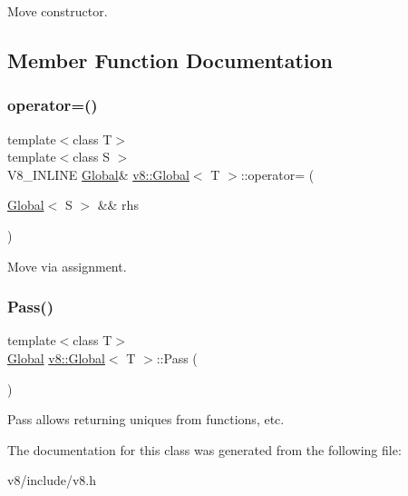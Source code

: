 Move constructor. 

\subsection{Member Function Documentation}
\mbox{\label{classv8_1_1Global_a9d3d7d8f10ad23e413f2027cc15ab209}} 
\subsubsection{\texorpdfstring{operator=()}{operator=()}}
{\footnotesize\ttfamily template$<$class T$>$ \\
template$<$class S $>$ \\
V8\+\_\+\+I\+N\+L\+I\+NE \mbox{\hyperlink{classv8_1_1Global}{Global}}\& \mbox{\hyperlink{classv8_1_1Global}{v8\+::\+Global}}$<$ T $>$\+::operator= (\begin{DoxyParamCaption}\item[{\mbox{\hyperlink{classv8_1_1Global}{Global}}$<$ S $>$ \&\&}]{rhs }\end{DoxyParamCaption})\hspace{0.3cm}{\ttfamily [inline]}}

Move via assignment. \mbox{\label{classv8_1_1Global_a914903149cc752468d4a3a11b6089c7e}} 
\subsubsection{\texorpdfstring{Pass()}{Pass()}}
{\footnotesize\ttfamily template$<$class T$>$ \\
\mbox{\hyperlink{classv8_1_1Global}{Global}} \mbox{\hyperlink{classv8_1_1Global}{v8\+::\+Global}}$<$ T $>$\+::Pass (\begin{DoxyParamCaption}{ }\end{DoxyParamCaption})\hspace{0.3cm}{\ttfamily [inline]}}

Pass allows returning uniques from functions, etc. 

The documentation for this class was generated from the following file\+:\begin{DoxyCompactItemize}
\item 
v8/include/v8.\+h\end{DoxyCompactItemize}
